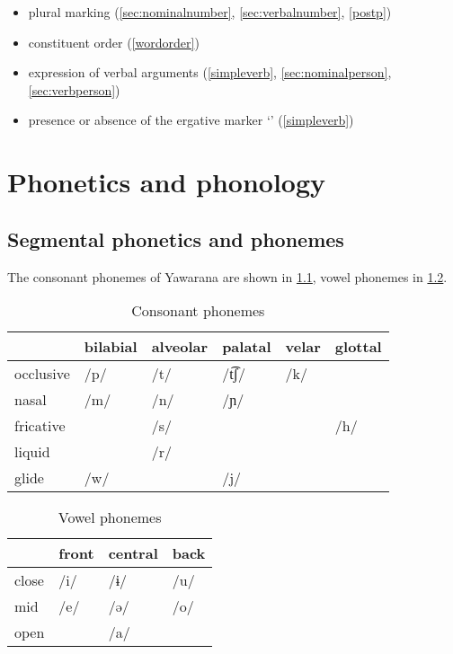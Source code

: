 \documentclass{memoir}
\begin{document}
\begin{itemize}
\tightlist
\item
  plural marking (\cref{sec:nominalnumber}, \cref{sec:verbalnumber},
  \cref{postp})
\item
  constituent order (\cref{wordorder})
\item
  expression of verbal arguments (\cref{simpleverb},
  \cref{sec:nominalperson}, \cref{sec:verbperson})
\item
  presence or absence of the ergative marker  `'
  (\cref{simpleverb})
\end{itemize}

\chapter{\texorpdfstring{Phonetics and phonology
\label{phono}}{Phonetics and phonology }}

\section{\texorpdfstring{Segmental phonetics and phonemes
\label{sec:segmental}}{Segmental phonetics and phonemes }}

The consonant phonemes of Yawarana are shown in \cref{tab:consonants},
vowel phonemes in \cref{tab:vowels}.

\begin{table}
\caption{Consonant phonemes}
\label{tab:consonants}
\centering
\begin{tabular}{llllll}
\toprule
          & bilabial & alveolar & palatal & velar & glottal \\
\midrule
occlusive &     /p/  &     /t/  &  /t͡ʃ/  &   /k/ &         \\
    nasal &     /m/  &     /n/  &    /ɲ/  &       &         \\
fricative &          &     /s/  &         &       &    /h/  \\
   liquid &          &     /r/  &         &       &         \\
    glide &     /w/  &          &     /j/ &       &         \\
\bottomrule
\end{tabular}

\end{table}

\begin{table}
\caption{Vowel phonemes}
\label{tab:vowels}
\centering
\begin{tabular}{llll}
\toprule
      & front & central & back \\
\midrule
close &  /i/  &    /ɨ/  & /u/  \\
  mid &  /e/  &    /ə/  & /o/  \\
 open &       &    /a/  &      \\
\bottomrule
\end{tabular}

\end{table}
\end{document}
